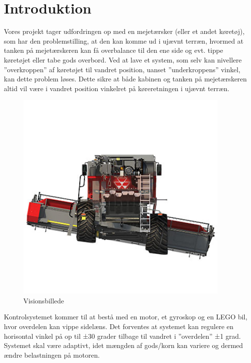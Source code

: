 \section{Introduktion}

Vores projekt tager udfordringen op med en mejetærsker (eller et andet køretøj), som har den problemstilling, at den kan komme ud i ujævnt terræn, hvormed at tanken på mejetærskeren kan få overbalance til den ene side og evt. tippe køretøjet eller tabe gods overbord. Ved at lave et system, som selv kan nivellere ”overkroppen” af køretøjet til vandret position, uanset ”underkroppens” vinkel, kan dette problem løses. Dette sikre at både kabinen og tanken på mejetærskeren altid vil være i vandret position vinkelret på køreretningen i ujævnt terræn.

\begin{figure}[H]
	\centering
	\includegraphics[width = 300pt]{figur/Visionbillede}
	\caption{Visionsbillede}
	\label{fig:konceptbillede}
\end{figure}

Kontrolsystemet kommer til at bestå med en motor, et gyroskop og en LEGO bil, hvor overdelen kan vippe sidelæns. Det forventes at systemet kan regulere en horisontal vinkel på op til ±30 grader tilbage til vandret i ”overdelen” ±1 grad. Systemet skal være adaptivt, idet mængden af gods/korn kan variere og dermed ændre belastningen på motoren.   \\ 

